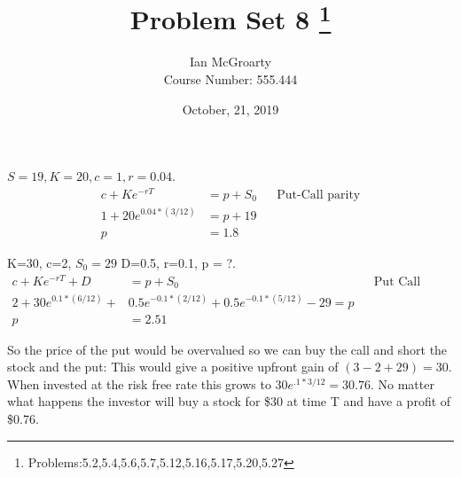 \documentclass[12pt]{article}
\title{Problem Set 8 \thanks{Problems:5.2,5.4,5.6,5.7,5.12,5.16,5.17,5.20,5.27}}
\author{Ian McGroarty \\
	Course Number: 555.444 \\
}
\date{October, 21, 2019}
\newenvironment{problem}[3][Problem]{\begin{trivlist}
\item[\hskip \labelsep {\bfseries #1}\hskip \labelsep {\bfseries #2.}]}{\end{trivlist}}
\begin{document}
\maketitle
\newpage
\begin{problem}{11.7}. $S=19, K=20, c = 1, r=0.04. $
\begin{align*}
c + Ke^{-rT} &= p + S_0 && \text{Put-Call parity} \\
1 + 20e^{0.04*(3/12) }&= p + 19 \\
p &= 1.8 
\end{align*}
\end{problem}


\begin{problem}{11.14}. K=30, c=2, $S_0=29$ D=0.5, r=0.1, p = ?.
\begin{align*}
c+Ke^{-rT}+D &= p +S_0 && \text{Put Call Parity} \\
2 + 30 e^{0.1*(6/12)} + &0.5 e^{-0.1*(2/12)} + 0.5e^{-0.1 *(5/12)} - 29 = p \\
p &= 2.51
\end{align*}
\end{problem}

\begin{problem}{11.15}. So the price of the put would be overvalued so we can buy the call and short the stock and the put: This would give a positive upfront gain of $(3-2+29)= 30.$ When invested at the risk free rate this grows to $30e^{.1*3/12} = 30.76$. No matter what happens the investor will buy a stock for \$30 at time T and have a profit of \$0.76. 

\end{problem}
\end{document}
